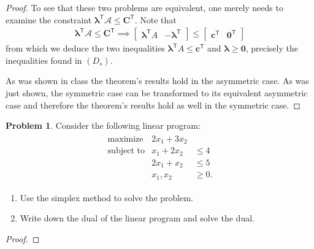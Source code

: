\documentclass[12pt]{article}
\theoremstyle{definition}
\newtheorem{problem}{Problem}
\newcommand{\vc}[1]{\boldsymbol{#1}}
\newcommand{\tran}{\mathsf{T}}
\begin{document}
\begin{proof}
  To see that these two problems are equivalent, one merely needs to examine the constraint $\vc{\lambda}^\tran\mathscr{A} \leq \vc{C}^\tran$.
  Note that
  \begin{align*}
    \vc{\lambda}^\tran\mathscr{A} \leq \vc{C}^\tran \implies \begin{bmatrix}\vc{\lambda}^\tran A & -\vc{\lambda}^\tran\end{bmatrix} \leq \begin{bmatrix}\vc{c}^\tran & \vc{0}^\tran\end{bmatrix}
  \end{align*}
  from which we deduce the two inequalities $\vc{\lambda}^\tran A \leq \vc{c}^\tran$ and $\vc{\lambda} \geq \vc{0}$, precisely the inequalities found in $(D_s)$.


  As was shown in class the theorem's results hold in the asymmetric case. As was just shown, the symmetric case
  can be transformed to its equivalent asymmetric case and therefore the theorem's results hold as well in the symmetric case.
\end{proof}
\newpage


\begin{problem}
  Consider the following linear program:
  \begin{align*}
    \begin{array}{rrl}
      \text{maximize} & 2x_1 + 3x_2 & \\
      \text{subject to} & x_1 + 2x_2 &\leq 4 \\
      & 2x_1 + x_2 &\leq 5 \\
      & x_1, x_2 &\geq 0.
    \end{array}
  \end{align*}
  \begin{enumerate}
    \item Use the simplex method to solve the problem.
    \item Write down the dual of the linear program and solve the dual.
  \end{enumerate}
\end{problem}

\begin{proof}
\end{proof}
\newpage
\end{document}
